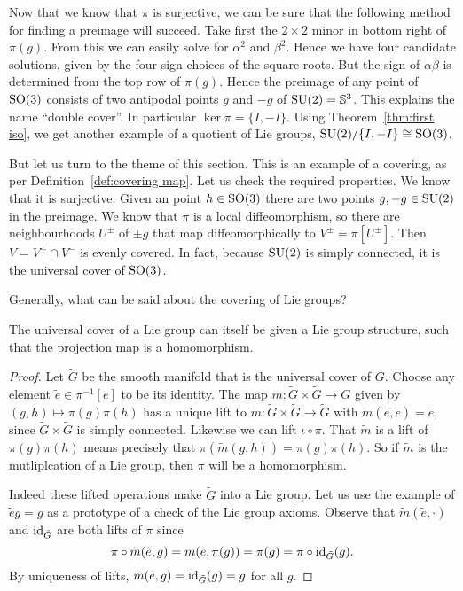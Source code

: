 Now that we know that $\pi$ is surjective, we can be sure that the following method for finding a preimage will succeed.
Take first the $2\times2$ minor in bottom right of $\pi(g)$.
From this we can easily solve for $\alpha^2$ and $\beta^2$.
Hence we have four candidate solutions, given by the four sign choices of the square roots.
But the sign of $\alpha\beta$ is determined from the top row of $\pi(g)$.
Hence the preimage of any point of $\mathrm{SO}(3)$ consists of two antipodal points $g$ and $-g$ of $\mathrm{SU}(2) = \mathbb{S}^3$.
This explains the name ``double cover''.
In particular $\ker \pi = \{I, -I\}$.
Using Theorem~\ref{thm:first iso}, we get another example of a quotient of Lie groups, $\mathrm{SU}(2)/\{I, -I\} \cong \mathrm{SO}(3)$.

But let us turn to the theme of this section. 
This is an example of a covering, as per Definition~\ref{def:covering map}.
Let us check the required properties.
We know that it is surjective.
Given an point $h \in \mathrm{SO}(3)$ there are two points $g,-g \in \mathrm{SU}(2)$ in the preimage.
We know that $\pi$ is a local diffeomorphism, so there are neighbourhoods $U^\pm$ of $\pm g$ that map diffeomorphically to $V^\pm = \pi[U^\pm]$.
Then $V = V^+ \cap V^-$ is evenly covered.
In fact, because $\mathrm{SU}(2)$ is simply connected, it is the universal cover of $\mathrm{SO}(3)$.

Generally, what can be said about the covering of Lie groups?
\begin{theorem}
The universal cover of a Lie group can itself be given a Lie group structure, such that the projection map is a homomorphism.
\end{theorem}
\begin{proof}
Let $\tilde{G}$ be the smooth manifold that is the universal cover of $G$.
Choose any element $\tilde{e} \in \pi^{-1}[e]$ to be its identity.
The map $m : \tilde{G}\times\tilde{G} \to G$ given by $(g,h) \mapsto \pi(g)\pi(h)$ has a unique lift to $\tilde{m} : \tilde{G}\times\tilde{G} \to \tilde{G}$ with $\tilde{m}(\tilde{e},\tilde{e}) = \tilde{e}$, since $\tilde{G}\times\tilde{G}$ is simply connected.
Likewise we can lift $\iota \circ \pi$.
That $\tilde{m}$ is a lift of $\pi(g)\pi(h)$ means precisely that $\pi(\tilde{m}(g,h)) = \pi(g)\pi(h)$.
So if $\tilde{m}$ is the mutliplcation of a Lie group, then $\pi$ will be a homomorphism.

Indeed these lifted operations make $\tilde{G}$ into a Lie group.
Let us use the example of $\tilde{e}g = g$ as a prototype of a check of the Lie group axioms.
Observe that $\tilde{m}(\tilde{e},\cdot)$ and $\operatorname{id}_{\tilde{G}}$ are both lifts of $\pi$ since
\[
\pi \circ \tilde{m}(\tilde{e},g) 
= m(e,\pi(g))
= \pi(g)
= \pi \circ \operatorname{id}_{\tilde{G}}(g).
\]
By uniqueness of lifts, $\tilde{m}(\tilde{e},g) = \operatorname{id}_{\tilde{G}}(g) = g$ for all $g$.
\end{proof}

